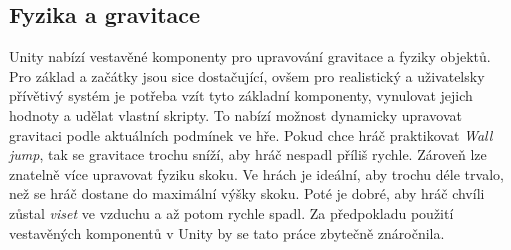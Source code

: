 \subsection{Fyzika a gravitace}

Unity nabízí vestavěné komponenty pro upravování gravitace a fyziky objektů. Pro základ a začátky jsou sice dostačující, ovšem pro realistický a uživatelsky přívětivý systém je potřeba vzít tyto základní komponenty, vynulovat jejich hodnoty a udělat vlastní skripty. To nabízí možnost dynamicky upravovat gravitaci podle aktuálních podmínek ve hře. Pokud chce hráč praktikovat \textit{Wall jump}, tak se gravitace trochu sníží, aby hráč nespadl příliš rychle. Zároveň lze znatelně více upravovat fyziku skoku. Ve hrách je ideální, aby trochu déle trvalo, než se hráč dostane do maximální výšky skoku. Poté je dobré, aby hráč chvíli zůstal \textit{viset} ve vzduchu a až potom rychle spadl. Za předpokladu použití vestavěných komponentů v Unity by se tato práce zbytečně znáročnila.